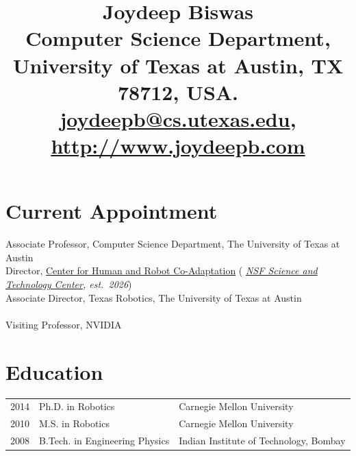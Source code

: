 \documentclass[Times]{article}
\begin{document}
\title{
\vspace{-3em}
\textbf{Joydeep Biswas}\\
\vspace{0.5em}
\normalsize{
Computer Science Department, University of Texas at Austin, TX 78712, USA.\\
\href{mailto:joydeepb@cs.utexas.edu}{joydeepb@cs.utexas.edu}, \href{http://www.joydeepb.com}{http://www.joydeepb.com}\vspace{-3em}}
}
\date{}
\maketitle


\section*{Current Appointment}

Associate Professor, Computer Science Department,
The University of Texas at Austin\\
Director, \href{http://hrc-stc.org/}{Center for Human and Robot Co-Adaptation} ({\small\itshape
\href{https://www.nsf.gov/news/nsf-launches-three-new-science-technology-centers-90m}{NSF Science and Technology Center}, est.\ 2026})\\
Associate Director, Texas Robotics,
The University of Texas at Austin\\
\vspace{-0.5em}\\
Visiting Professor, NVIDIA

\section*{Education}
\begin{tabular}{ p{1.2cm} l l }
  2014  & Ph.D. in Robotics  & Carnegie Mellon University \\
  2010  & M.S. in Robotics  & Carnegie Mellon University \\
  2008  & B.Tech. in Engineering Physics & Indian Institute of Technology, Bombay \\
\end{tabular}
\end{document}
